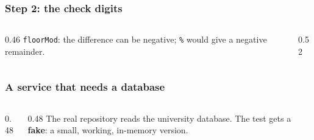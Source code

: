 \documentclass[aspectratio=169,10pt,compress]{beamer}
\begin{document}
\begin{frame}[t,fragile] \frametitle{Step 2: the check digits}
  \begin{columns}[T]
    \begin{column}{0.46\textwidth}
      \small \texttt{floorMod}: the difference can be negative; \texttt{\%} would give a negative remainder.
    \end{column}
    \begin{column}{0.52\textwidth}
    \end{column}
  \end{columns}
\end{frame}





\begin{frame}[t,fragile] \frametitle{A service that needs a database}
  \begin{columns}[T]
    \begin{column}{0.48\textwidth}
    \end{column}
    \begin{column}{0.48\textwidth}
      \small The real repository reads the university database. The test gets a \textbf{fake}: a small, working, in-memory version.
    \end{column}
  \end{columns}
\end{frame}
\end{document}
